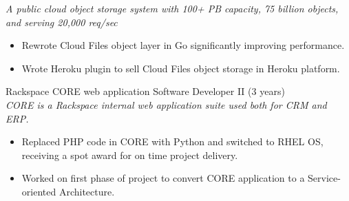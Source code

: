 \documentclass[margin,line]{resume}
\begin{document}
\begin{resume}
{\small\textit{A public cloud object storage system with 100+ PB capacity, 75 billion
objects, and serving 20,000 req/sec}}
\begin{itemize} \itemsep -2pt %
\small\item Rewrote Cloud Files object layer in Go significantly improving performance.
\small\item Wrote Heroku plugin to sell Cloud Files object storage in Heroku platform.
\end{itemize}\vspace{-\baselineskip} %
\vspace{4pt}
{\small Rackspace CORE web application  \hfill  Software Developer II (3 years)}\\
{\small\textit{CORE is a Rackspace internal web application suite used both for CRM and ERP.}}
\begin{itemize} \itemsep -2pt %
\small\item Replaced PHP code in CORE with Python and switched to RHEL OS, receiving a spot award for on time project delivery.
\small\item Worked on first phase of project to convert CORE application to a Service-oriented Architecture.
\end{itemize}
\vspace{4pt}


\end{resume}
\end{document}
